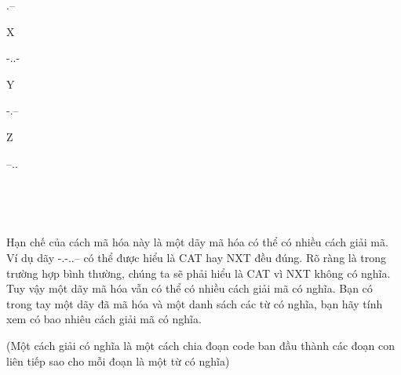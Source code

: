 .--

X

-..-

Y

-.--

Z

--..

 

 

Hạn chế của cách mã hóa này là một dãy mã hóa có thể có nhiều cách giải mã. Ví dụ dãy -.-..-- có thể được hiểu là CAT hay NXT đều đúng. Rõ ràng là trong trường hợp bình thường, chúng ta sẽ phải hiểu là CAT vì NXT không có nghĩa. Tuy vậy một dãy mã hóa vẫn có thể có nhiều cách giải mã có nghĩa. Bạn có trong tay một dãy đã mã hóa và một danh sách các từ có nghĩa, bạn hãy tính xem có bao nhiêu cách giải mã có nghĩa.

(Một cách giải có nghĩa là một cách chia đoạn code ban đầu thành các đoạn con liên tiếp sao cho mỗi đoạn là một từ có nghĩa)